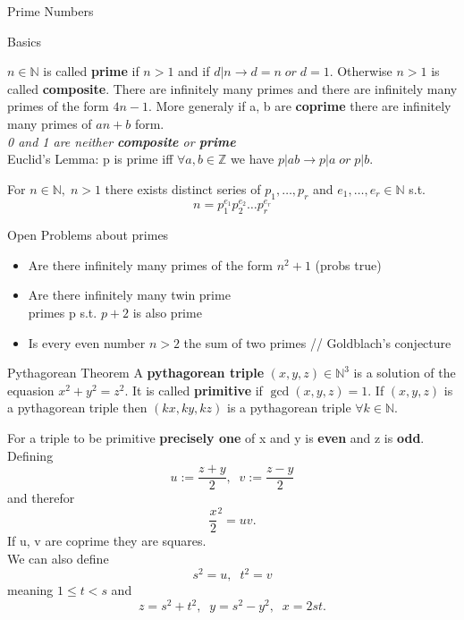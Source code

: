 \documentclass[12pt, letterpaper]{article}
\begin{document}
\begin{section}{Prime Numbers}

  \begin{subsection}{Basics}

    \(n \in \mathbb{N}\) is called \textbf{prime} if \(n > 1\) and if
    \(d | n \to d = n \; or \; d = 1\). Otherwise \(n > 1\) is called \textbf{composite}.
    There are infinitely many primes and there are infinitely many primes of the
    form \(4n - 1\). More generaly if a, b are \textbf{coprime} there are infinitely
    many primes of \(an + b\) form. \\
    \emph{0 and 1 are neither \textbf{composite} or \textbf{prime}} \\
    Euclid's Lemma: p is prime iff \(\forall a, b \in \mathbb{Z}\) we have
    \(p | ab \to p | a \; or \; p | b\).

    For \(n \in \mathbb{N}, \; n > 1\) there exists distinct series of
    \(p_{1}, \dots, p_{r}\) and \(e_{1}, \dots, e_{r} \in \mathbb{N}\) s.t.
    \[n = p_{1}^{e_{1}} p_{2}^{e_{2}} \dots p_{r}^{e_{r}}\]

  \end{subsection}

  \begin{subsection}{Open Problems about primes}

    \begin{itemize}
      \item Are there infinitely many primes of the form \(n^{2} + 1\) (probs true)
      \item Are there infinitely many twin prime \\
            primes p s.t. \(p + 2\) is also prime
      \item Is every even number \(n > 2\) the sum of two primes //
            Goldblach's conjecture
    \end{itemize}

  \end{subsection}

  \begin{subsection}{Pythagorean Theorem}
    A \textbf{pythagorean triple} \((x, y, z) \in \mathbb{N}^{3}\) is a solution
    of the equasion \(x^{2} + y^{2} = z^{2}\). It is called \textbf{primitive}
    if \(\gcd(x, y, z) = 1\). If \((x, y, z)\) is a pythagorean triple then
    \((kx, ky, kz)\) is a pythagorean triple \(\forall k \in \mathbb{N}\).

    For a triple to be primitive \textbf{precisely one} of x and y is \textbf{even}
    and z is \textbf{odd}. Defining \[u := \frac{z + y}{2} , \;\; v := \frac{z - y}{2}\]
    and therefor \[\frac{x}{2}^{2} = uv.\]
    If u, v are coprime they are squares. \\
    We can also define \[s^{2} = u , \;\; t^{2} = v\]
    meaning \(1 \leq t < s\) and \[z = s^{2} + t^{2}, \;\; y = s^{2} - y^{2}, \;\; x = 2st.\]


\end{subsection}
\end{section}
\end{document}

